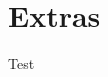 \chapter{Extras}
\label{chap:extras}

\begin{writingdirectives}

    \item Test

\end{writingdirectives}
